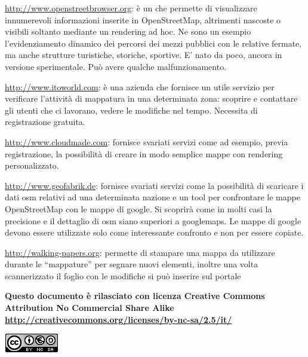 \documentclass[a4paper,twoside,12pt,]{article}
\newcommand{\osm}{OpenStreetMap\xspace}
\begin{document}
\url{http://www.openstreetbrowser.org}: è un che permette di visualizzare innumerevoli informazioni inserite in \osm, altrimenti nascoste o visibili soltanto mediante un rendering ad hoc. Ne sono un esempio l'evidenziamento dinamico dei percorsi dei mezzi pubblici con le relative fermate, ma anche strutture turistiche, storiche, sportive. E' nato da poco, ancora in versione sperimentale. Può avere qualche malfunzionamento.

\url{http://www.itoworld.com}: è una azienda che fornisce un utile servizio per verificare l'attività di mappatura in una determinata zona: scoprire  e contattare gli utenti che ci lavorano, vedere le modifiche nel tempo. Necessita di registrazione gratuita.

\url{http://www.cloudmade.com}: fornisce svariati servizi come ad esempio, previa registrazione, la possibilità di creare in modo semplice mappe con rendering personalizzato.

\url{http://www.geofabrik.de}: fornisce svariati servizi come la possibilità di scaricare i dati osm relativi ad una determinata nazione e un tool per confrontare le mappe \osm con le mappe di google. Si scoprirà come in molti casi la precisione e il dettaglio di osm siano superiori a googlemaps. Le mappe di google devono essere utilizzate solo come interessante confronto e non per essere copiate.

\url{http://walking-papers.org}: permette di stampare una mappa da utilizzare durante le ``mappature'' per segnare nuovi elementi, inoltre una volta scannerizzato il foglio con le modifiche si può inserire sul portale
\newpage
\begin{center}\begin{small}\textbf{
Questo documento è rilasciato con licenza 
Creative Commons Attribution No Commercial Share Alike
\url{http://creativecommons.org/licenses/by-nc-sa/2.5/it/}}\end{small}\end{center}
\begin{center}
 \includegraphics{ccbysa.png}
\end{center}
\end{document}
